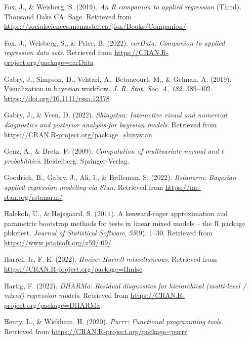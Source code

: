 \documentclass[
  english,
  man]{apa6}
\newlength{\cslhangindent}
\newlength{\cslentryspacingunit} %
\newenvironment{CSLReferences}[2] %
 {%
  \setlength{\parindent}{0pt}
  \ifodd #1
  \let\oldpar\par
  \def\par{\hangindent=\cslhangindent\oldpar}
  \fi
  \setlength{\parskip}{#2\cslentryspacingunit}
 }%
 {}
\begin{document}
\begin{CSLReferences}{1}{0}
\leavevmode{}%
Fox, J., \& Weisberg, S. (2019). \emph{An {R} companion to applied regression} (Third). Thousand Oaks {CA}: Sage. Retrieved from \url{https://socialsciences.mcmaster.ca/jfox/Books/Companion/}

\leavevmode{}%
Fox, J., Weisberg, S., \& Price, B. (2022). \emph{carData: Companion to applied regression data sets}. Retrieved from \url{https://CRAN.R-project.org/package=carData}

\leavevmode{}%
Gabry, J., Simpson, D., Vehtari, A., Betancourt, M., \& Gelman, A. (2019). Visualization in bayesian workflow. \emph{J. R. Stat. Soc. A}, \emph{182}, 389--402. \url{https://doi.org/10.1111/rssa.12378}

\leavevmode{}%
Gabry, J., \& Veen, D. (2022). \emph{Shinystan: Interactive visual and numerical diagnostics and posterior analysis for bayesian models}. Retrieved from \url{https://CRAN.R-project.org/package=shinystan}

\leavevmode{}%
Genz, A., \& Bretz, F. (2009). \emph{Computation of multivariate normal and t probabilities}. Heidelberg: Springer-Verlag.

\leavevmode{}%
Goodrich, B., Gabry, J., Ali, I., \& Brilleman, S. (2022). \emph{Rstanarm: {Bayesian} applied regression modeling via {Stan}.} Retrieved from \url{https://mc-stan.org/rstanarm/}

\leavevmode{}%
Halekoh, U., \& Højsgaard, S. (2014). A kenward-roger approximation and parametric bootstrap methods for tests in linear mixed models -- the {R} package {pbkrtest}. \emph{Journal of Statistical Software}, \emph{59}(9), 1--30. Retrieved from \url{https://www.jstatsoft.org/v59/i09/}

\leavevmode{}%
Harrell Jr, F. E. (2022). \emph{Hmisc: Harrell miscellaneous}. Retrieved from \url{https://CRAN.R-project.org/package=Hmisc}

\leavevmode{}%
Hartig, F. (2022). \emph{DHARMa: Residual diagnostics for hierarchical (multi-level / mixed) regression models}. Retrieved from \url{https://CRAN.R-project.org/package=DHARMa}

\leavevmode{}%
Henry, L., \& Wickham, H. (2020). \emph{Purrr: Functional programming tools}. Retrieved from \url{https://CRAN.R-project.org/package=purrr}


\end{CSLReferences}
\end{document}
